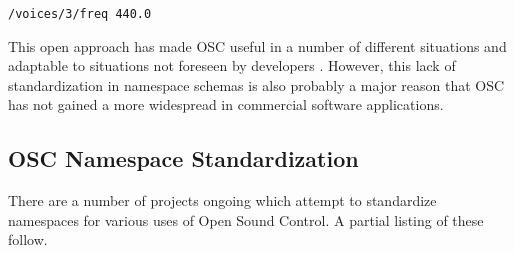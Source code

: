 \documentclass{sig-alternate}
\begin{document}
\texttt{/voices/3/freq 440.0}

This open approach has made OSC useful in a number of different situations and adaptable to situations not foreseen by developers \cite{Wright:2005}.  However, this lack of standardization in namespace schemas is also probably a major reason that OSC has not gained a more widespread in commercial software applications.


\subsection{OSC Namespace Standardization}

There are a number of projects ongoing which attempt to standardize namespaces for various uses of Open Sound Control. A partial listing of these follow.
\end{document}
